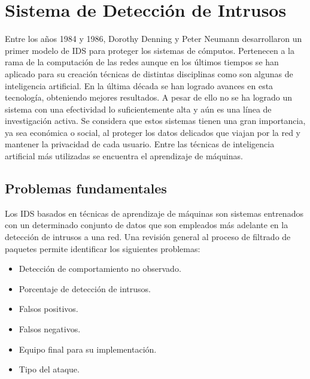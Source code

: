 \chapter{Sistema de Detección de Intrusos}\label{chapter:ids}

Entre los años 1984 y 1986, Dorothy Denning y Peter Neumann desarrollaron un primer modelo de IDS \cite{denning1985requirements} para proteger los sistemas de cómputos. Pertenecen a la rama de la computación de las redes aunque en los últimos tiempos se han aplicado para su creación técnicas de distintas disciplinas como son algunas de inteligencia artificial. En la última década se han logrado avances en esta tecnología, obteniendo mejores resultados. A pesar de ello no se ha logrado un sistema con una efectividad lo suficientemente alta y aún es una línea de investigación activa. Se considera que estos sistemas tienen una gran importancia, ya sea económica o social, al proteger los datos delicados que viajan por la red y mantener la privacidad de cada usuario. Entre las técnicas de inteligencia artificial más utilizadas se encuentra el aprendizaje de máquinas.

\section{Problemas fundamentales}
Los IDS basados en técnicas de aprendizaje de máquinas son sistemas entrenados con un determinado conjunto de datos que son empleados más adelante en la detección de intrusos a una red. Una revisión general al proceso de filtrado de paquetes permite identificar los siguientes problemas:
\begin{itemize}
    \item Detección de comportamiento no observado.
    \item Porcentaje de detección de intrusos.
    \item Falsos positivos.
    \item Falsos negativos.
    \item Equipo final para su implementación.
    \item Tipo del ataque.
\end{itemize}

